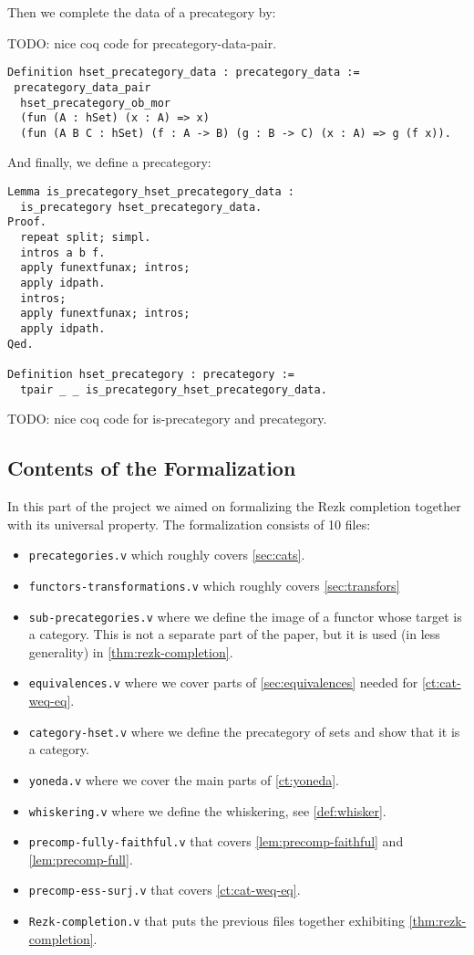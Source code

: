 Then we complete the data of a precategory by:

TODO: nice coq code for precategory-data-pair.
\begin{lstlisting}
Definition hset_precategory_data : precategory_data :=
 precategory_data_pair 
  hset_precategory_ob_mor 
  (fun (A : hSet) (x : A) => x) 
  (fun (A B C : hSet) (f : A -> B) (g : B -> C) (x : A) => g (f x)).
\end{lstlisting}
And finally, we define a precategory:
\begin{lstlisting}
Lemma is_precategory_hset_precategory_data :
  is_precategory hset_precategory_data.
Proof.
  repeat split; simpl.
  intros a b f.
  apply funextfunax; intros;
  apply idpath.
  intros;
  apply funextfunax; intros;
  apply idpath.
Qed.

Definition hset_precategory : precategory := 
  tpair _ _ is_precategory_hset_precategory_data.
\end{lstlisting}


TODO: nice coq code for is-precategory and precategory.




\subsection*{Contents of the Formalization}

In this part of the project we aimed on formalizing the Rezk completion together with its universal property. The formalization consists of 10 files:
\begin{itemize}
 \item \texttt{precategories.v} which roughly covers \autoref{sec:cats}.
 \item \texttt{functors-transformations.v} which roughly covers \autoref{sec:transfors}
 \item \texttt{sub-precategories.v} where we define the image of a functor whose target is a category. 
          This is not a separate part of the paper, but it is used (in less generality) in \autoref{thm:rezk-completion}.
 \item \texttt{equivalences.v} where we cover parts of \autoref{sec:equivalences} needed for \autoref{ct:cat-weq-eq}.
 \item \texttt{category-hset.v} where we define the precategory of sets and show that it is a category.
 \item \texttt{yoneda.v} where we cover the main parts of \autoref{ct:yoneda}.
 \item \texttt{whiskering.v} where we define the whiskering, see \autoref{def:whisker}.
 \item \texttt{precomp-fully-faithful.v} that covers \autoref{lem:precomp-faithful} and \ref{lem:precomp-full}.
 \item \texttt{precomp-ess-surj.v} that covers \autoref{ct:cat-weq-eq}.
 \item \texttt{Rezk-completion.v} that puts the previous files together exhibiting \autoref{thm:rezk-completion}.
\end{itemize}
